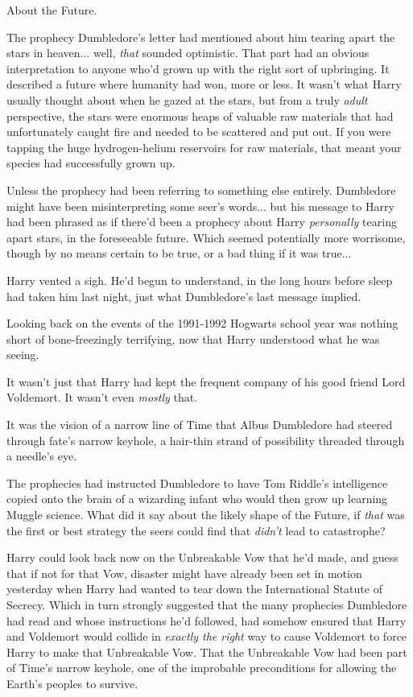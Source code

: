 About the Future.

The prophecy Dumbledore's letter had mentioned about him tearing apart the stars in heaven... well, \emph{that} sounded optimistic. That part had an obvious interpretation to anyone who'd grown up with the right sort of upbringing. It described a future where humanity had won, more or less. It wasn't what Harry usually thought about when he gazed at the stars, but from a truly \emph{adult} perspective, the stars were enormous heaps of valuable raw materials that had unfortunately caught fire and needed to be scattered and put out. If you were tapping the huge hydrogen-helium reservoirs for raw materials, that meant your species had successfully grown up.

Unless the prophecy had been referring to something else entirely. Dumbledore might have been misinterpreting some seer's words... but his message to Harry had been phrased as if there'd been a prophecy about Harry \emph{personally} tearing apart stars, in the foreseeable future. Which seemed potentially more worrisome, though by no means certain to be true, or a bad thing if it was true...

Harry vented a sigh. He'd begun to understand, in the long hours before sleep had taken him last night, just what Dumbledore's last message implied.

Looking back on the events of the 1991-1992 Hogwarts school year was nothing short of bone-freezingly terrifying, now that Harry understood what he was seeing.

It wasn't just that Harry had kept the frequent company of his good friend Lord Voldemort. It wasn't even \emph{mostly} that.

It was the vision of a narrow line of Time that Albus Dumbledore had steered through fate's narrow keyhole, a hair-thin strand of possibility threaded through a needle's eye.

The prophecies had instructed Dumbledore to have Tom Riddle's intelligence copied onto the brain of a wizarding infant who would then grow up learning Muggle science. What did it say about the likely shape of the Future, if \emph{that} was the first or best strategy the seers could find that \emph{didn't} lead to catastrophe?

Harry could look back now on the Unbreakable Vow that he'd made, and guess that if not for that Vow, disaster might have already been set in motion yesterday when Harry had wanted to tear down the International Statute of Secrecy. Which in turn strongly suggested that the many prophecies Dumbledore had read and whose instructions he'd followed, had somehow ensured that Harry and Voldemort would collide in \emph{exactly the right} way to cause Voldemort to force Harry to make that Unbreakable Vow. That the Unbreakable Vow had been part of Time's narrow keyhole, one of the improbable preconditions for allowing the Earth's peoples to survive.

